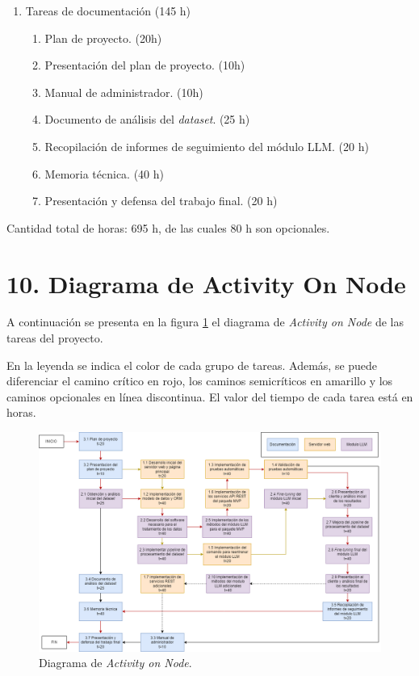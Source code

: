 \documentclass[
11pt, %
]{Clases/charter}
\begin{document}
\begin{enumerate}
\begin{enumerate}
	      \end{enumerate}
	\item Tareas de documentación (145 h)
	      \begin{enumerate}
		      \item Plan de proyecto. (20h)
		      \item Presentación del plan de proyecto. (10h)
		      \item Manual de administrador. (10h)
		      \item Documento de análisis del \textit{dataset}. (25 h)
		      \item Recopilación de informes de seguimiento del módulo LLM. (20 h)
		      \item Memoria técnica. (40 h)
		      \item Presentación y defensa del trabajo final. (20 h)
	      \end{enumerate}
\end{enumerate}

Cantidad total de horas: 695 h, de las cuales 80 h son opcionales.
\section{10. Diagrama de Activity On Node}
\label{sec:AoN}
A continuación se presenta en la figura \ref{fig:AoN} el diagrama de \textit{Activity on Node} de las tareas del proyecto.

En la leyenda se indica el color de cada grupo de tareas.
Además, se puede diferenciar el camino crítico en rojo, los caminos semicríticos en amarillo y los caminos opcionales en línea discontinua.
El valor del tiempo de cada tarea está en horas.
\begin{figure}[htpb]
	\centering
	\includegraphics[width=.75\paperwidth]{./Figuras/AoN.png}
	\caption{Diagrama de \textit{Activity on Node}.}
	\label{fig:AoN}
\end{figure}
\end{document}
